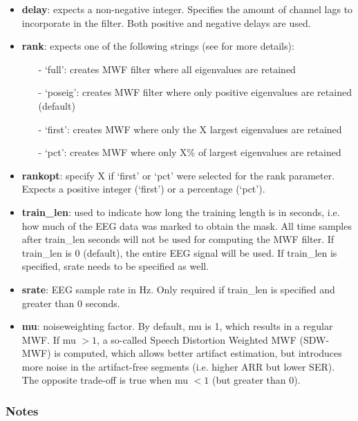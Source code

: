 \documentclass[11pt]{article}
\begin{document}
\begin{itemize}
\item \textbf{delay}: expects a non-negative integer. Specifies the amount of channel lags to incorporate in the filter. Both positive and negative delays are used.

\item \textbf{rank}: expects one of the following strings (see \cite{somers2018generic} for more details):
\begin{itemize}
\item[-] `full': creates MWF filter where all eigenvalues are retained
\item[-] `poseig': creates MWF filter where only positive eigenvalues are retained (default)
\item[-] `first': creates MWF where only the X largest eigenvalues are retained
\item[-] `pct': creates MWF where only X\% of largest eigenvalues are retained
\end{itemize}

\item \textbf{rankopt}: specify X if `first' or `pct' were selected for the rank parameter. Expects a positive integer (`first') or a percentage (`pct').

\item \textbf{train\_len}: used to indicate how long the training length is in seconds, i.e. how much of the EEG data was marked to obtain the mask. All time samples after train\_len seconds will not be used for computing the MWF filter. If train\_len is 0 (default), the entire EEG signal will be used. If train\_len is specified, srate needs to be specified as well.

\item \textbf{srate}: EEG sample rate in Hz. Only required if train\_len is specified and greater than 0 seconds.

\item \textbf{mu}: noiseweighting factor. By default, mu is 1, which results in a regular MWF. If mu $> 1$, a so-called Speech Distortion Weighted MWF (SDW-MWF) is computed, which allows better artifact estimation, but introduces more noise in the artifact-free segments (i.e. higher ARR but lower SER). The opposite trade-off is true when mu $< 1$ (but greater than 0).

\end{itemize}

\subsubsection{Notes}
\end{document}
